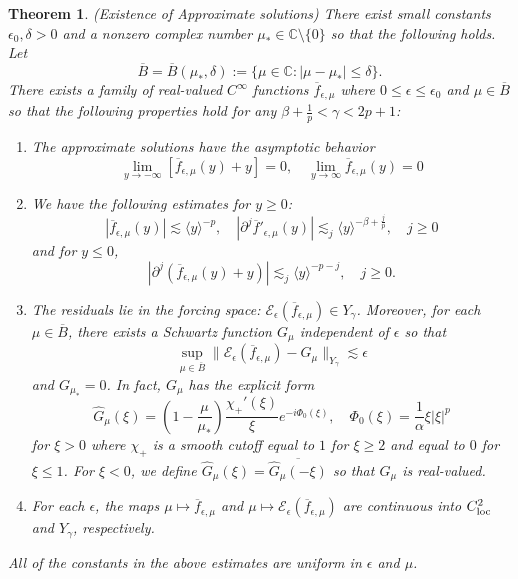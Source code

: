 \documentclass[11pt]{amsart}
\newtheorem{theorem}{Theorem}[section]
\theoremstyle{definition}
\theoremstyle{remark}
\numberwithin{equation}{section}
\newcommand{\mc}[1]{\mathcal{#1}}
\newcommand{\ov}[1]{\overline{#1}}
\newcommand{\ang}[1]{\langle #1 \rangle}
\begin{document}
\begin{theorem}\label{thm:fixed_point_approximation}(Existence of Approximate solutions)
    There exist small constants $\epsilon_0, \delta > 0$ and a nonzero complex number $\mu_* \in \mathbb{C} \setminus \{0\}$ so that the following holds. Let 
    \[\ov{B} = \ov{B}(\mu_*, \delta) := \{\mu \in \mathbb{C} : |\mu - \mu_*| \leq \delta\}.\]
    There exists a family of real-valued $C^\infty$ functions $\ov{f}_{\epsilon, \mu}$ where $0 \leq \epsilon \leq \epsilon_0$ and $\mu \in \ov{B}$ so that the following properties hold for any $\beta + \frac{1}{p} < \gamma < 2p + 1$:
    \begin{enumerate}
        \item The approximate solutions have the asymptotic behavior
        \[\lim_{y \to -\infty} [\ov{f}_{\epsilon, \mu}(y) + y] = 0, \quad \lim_{y \to \infty} \ov{f}_{\epsilon, \mu}(y) = 0\]
        \item We have the following estimates for $y \geq 0$:
        \[|\ov{f}_{\epsilon, \mu}(y)| \lesssim \ang{y}^{-p}, \quad |\partial^{j}\ov{f}'_{\epsilon, \mu}(y)| \lesssim_j \ang{y}^{-\beta + \frac{j}{p}}, \quad j \geq 0\]
        and for $y \leq 0$,
        \[|\partial^{j}(\ov{f}_{\epsilon, \mu}(y) + y)| \lesssim_j \ang{y}^{-p - j}, \quad j \geq 0.\]
        \item The residuals lie in the forcing space: $\mc{E}_\epsilon(\ov{f}_{\epsilon, \mu}) \in Y_\gamma$. Moreover, for each $\mu \in \ov{B}$, there exists a Schwartz function $G_\mu$ independent of $\epsilon$ so that
        \begin{equation}\label{eqn:fixed_point_residual_bound}
\sup_{\mu \in \ov{B}}\|\mc{E}_\epsilon(\ov{f}_{\epsilon, \mu}) - G_\mu\|_{Y_\gamma} \lesssim \epsilon
\end{equation} 
        and $G_{\mu_*} = 0$. In fact, $G_{\mu}$ has the explicit form 
        \[\widehat{G}_{\mu}(\xi) = \left(1 - \frac{\mu}{\mu_*}\right) \frac{\chi_+'(\xi)}{\xi}e^{-i \Phi_0(\xi)}, \quad \Phi_0(\xi) = \frac{1}{\alpha}\xi|\xi|^{p}\]
        for $\xi > 0$ where $\chi_+$ is a smooth cutoff equal to $1$ for $\xi \geq 2$ and equal to $0$ for $\xi \leq 1$. For $\xi < 0$, we define $\widehat{G}_{\mu}(\xi) = \overline{\widehat{G}_{\mu}(-\xi)}$ so that $G_{\mu}$ is real-valued.
        \item For each $\epsilon$, the maps $\mu \mapsto \ov{f}_{\epsilon, \mu}$ and $\mu \mapsto \mc{E}_\epsilon(\ov{f}_{\epsilon, \mu})$ are continuous into $C^2_{\textup{loc}}$ and $Y_\gamma$, respectively.
    \end{enumerate}
    All of the constants in the above estimates are uniform in $\epsilon$ and $\mu$.
\end{theorem}
\end{document}
